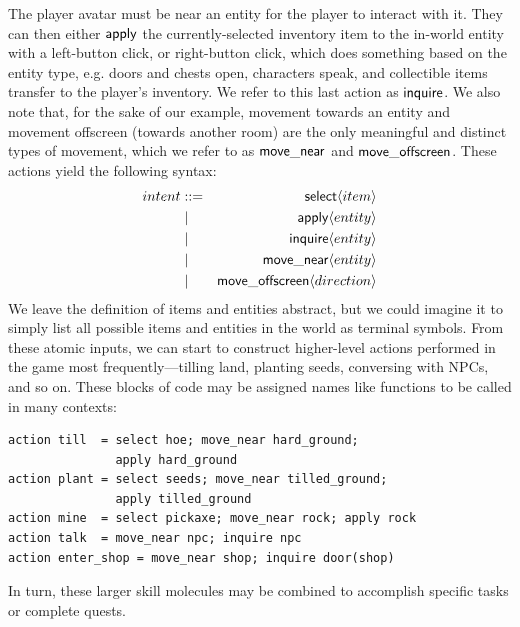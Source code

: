 The player avatar must be near an entity for the player to interact with
it. They can then either $\mathsf{apply}$ the currently-selected inventory
item to the in-world entity with a left-button click, or right-button
click, which does something based on the entity type, e.g. doors and chests
open, characters speak, and collectible items transfer to the player's
inventory. We refer to this last action as $\mathsf{inquire}$. We also note
that, for the sake of our example, movement towards an entity and movement
offscreen (towards another room) are the only meaningful and distinct types
of movement, which we refer to as $\mathsf{move\_near}$ and
$\mathsf{move\_offscreen}$. These actions yield the following syntax:
%
\begin{eqnarray*}
intent &::=& \mathsf{select} \langle item \rangle\\
       &\mid& \mathsf{apply} \langle entity \rangle\\
       &\mid& \mathsf{inquire} \langle entity \rangle\\
       &\mid& \mathsf{move\_near} \langle entity \rangle\\
       &\mid& \mathsf{move\_offscreen} \langle direction \rangle
\end{eqnarray*}
%
We leave the definition of items and entities abstract, but we could
imagine it to simply list all possible items and entities in the world as
terminal symbols.  
%
From these atomic inputs, we can start to construct higher-level actions
performed in the game most frequently---tilling land, planting seeds,
conversing with NPCs, and so on. These blocks of code may be assigned names
like functions to be called in many contexts:
%
% 
%
\begin{verbatim}
action till  = select hoe; move_near hard_ground; 
               apply hard_ground
action plant = select seeds; move_near tilled_ground; 
               apply tilled_ground
action mine  = select pickaxe; move_near rock; apply rock
action talk  = move_near npc; inquire npc
action enter_shop = move_near shop; inquire door(shop)
\end{verbatim}
%
In turn, these larger skill molecules may be combined to accomplish
specific tasks or complete quests.

